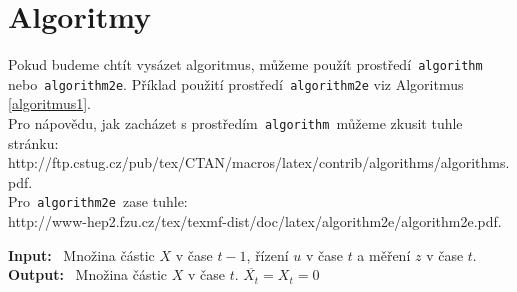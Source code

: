 \documentclass[11pt,a4paper,titlepage]{article}
\begin{document}
\section{Algoritmy}
	\label{algoritmy}
	Pokud budeme chtít vysázet algoritmus, můžeme použít prostředí\texttt{ algorithm }nebo\texttt{ algorithm2e}.
	Příklad použití prostředí\texttt{ algorithm2e} viz Algoritmus \ref{algoritmus1}.\\

	Pro nápovědu, jak zacházet s prostředím\texttt{ algorithm }můžeme zkusit tuhle stránku:\\
	http://ftp.cstug.cz/pub/tex/CTAN/macros/latex/contrib/algorithms/algorithms.pdf. \\
	Pro\texttt{ algorithm2e }zase tuhle:\\
	http://www-hep2.fzu.cz/tex/texmf-dist/doc/latex/algorithm2e/algorithm2e.pdf.\\

	\begin{algorithm2e}[H]
		\dontprintsemicolon
		\linesnotnumbered
		\textbf{Input:} \ Množina částic $X$ v čase $t-1$, řízení $u$ v čase $t$ a měření $z$ v čase $t$.\\
		\textbf{Output:} \ Množina částic $X$ v čase $t$. $\overline{X_{t}}=X_{t}=0$\\
		\BlankLine
		\caption{$Particle filter$}
		\label{algoritmus1}
	\end{algorithm2e}
\end{document}
